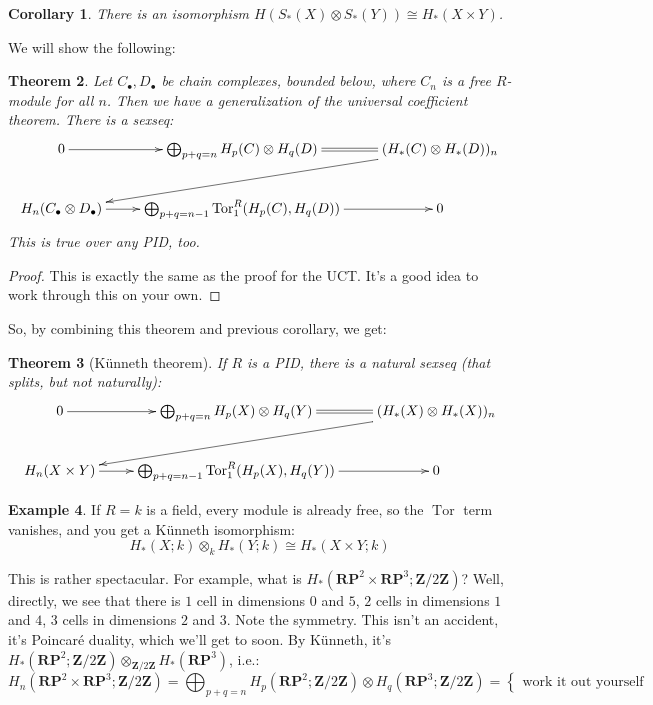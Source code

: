 \documentclass{amsart}
\theoremstyle{theorem}
\newtheorem{theorem}{Theorem}[section]
\newtheorem{corollary}[theorem]{Corollary}
\theoremstyle{definition}
\newtheorem{example}[theorem]{Example}
\DeclareMathOperator{\Tor}{Tor}
\newcommand{\RP}{\mathbf{RP}}
\newcommand{\Z}{\mathbf Z}
\begin{document}
\begin{corollary}
There is an isomorphism $ H(S_\ast(X)\otimes S_\ast(Y))\cong H_\ast(X\times Y)$.
\end{corollary}
We will show the following:
\begin{theorem}
Let $C_\bullet,D_\bullet$ be chain complexes, bounded below, where $C_n$ is a free $R$-module for all $n$. Then we have a generalization of the universal coefficient theorem. There is a sexseq:
\begin{equation*}
\xymatrix{0\ar[r] & \bigoplus_{p+q=n} H_p(C)\otimes H_q(D)\ar@{=}[r] & ( H_\ast(C)\otimes H_\ast(D))_n\ar[dll]\\
 H_n(C_\bullet\otimes D_\bullet)\ar[r] & \bigoplus_{p+q=n-1}\Tor^R_1( H_p(C), H_q(D))\ar[r] & 0}
\end{equation*}
This is true over any PID, too.
\end{theorem}
\begin{proof}
This is exactly the same as the proof for the UCT. It's a good idea to work through this on your own.
\end{proof}
So, by combining this theorem and previous corollary, we get:
\begin{theorem}[K\"{u}nneth theorem]
If $R$ is a PID, there is a natural sexseq (that splits, but not naturally):
\begin{equation*}
\xymatrix{0\ar[r] & \bigoplus_{p+q=n} H_p(X)\otimes H_q(Y)\ar@{=}[r] & ( H_\ast(X)\otimes H_\ast(X))_n\ar[dll]\\
 H_n(X\times Y)\ar[r] & \bigoplus_{p+q=n-1}\Tor^R_1( H_p(X), H_q(Y))\ar[r] & 0}
\end{equation*}
\end{theorem}
\begin{example}
If $R=k$ is a field, every module is already free, so the $\Tor$ term vanishes, and you get a K\"{u}nneth isomorphism:
\begin{equation*}
 H_\ast(X;k)\otimes_k H_\ast(Y;k)\cong H_\ast(X\times Y;k)
\end{equation*}
\end{example}
This is rather spectacular. For example, what is $ H_\ast(\RP^2\times\RP^3;\Z/2\Z)$? Well, directly, we see that there is $1$ cell in dimensions $0$ and $5$, $2$ cells in dimensions $1$ and $4$, $3$ cells in dimensions $2$ and $3$. Note the symmetry. This isn't an accident, it's Poincar\'{e} duality, which we'll get to soon. By K\"{u}nneth, it's $ H_\ast(\RP^2;\Z/2\Z)\otimes_{\Z/2\Z} H_\ast(\RP^3)$, i.e.:
\begin{equation*}
 H_n(\RP^2\times\RP^3;\Z/2\Z)=\bigoplus_{p+q=n} H_p(\RP^2;\Z/2\Z)\otimes H_q(\RP^3;\Z/2\Z)=\begin{cases}
\text{work it out yourself}
\end{cases}
\end{equation*}
\end{document}
